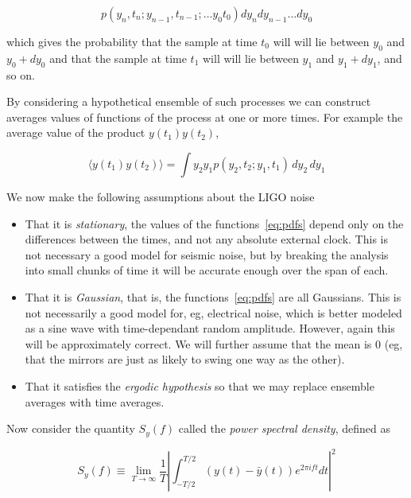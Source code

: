 \begin{equation*}
\label{eq:pdfs}
p(y_n, t_n; y_{n-1}, t_{n-1}; \ldots y_0 t_0) dy_n dy_{n-1} \ldots
dy_0
\end{equation*}

which gives the probability that the sample at time $t_0$ will will
lie between $y_0$ and $y_0 + dy_0$ and that the sample at time $t_1$
will will lie between $y_1$ and $y_1 + dy_1$, and so on.

By considering a hypothetical ensemble of such processes we can 
construct averages values of functions of the process at one or more
times.  For example the average value of the product $y(t_1)y(t_2)$,

\begin{equation*}
\langle y(t_1) y(t_2) \rangle = \int y_2 y_1
p(y_2, t_2; y_1, t_1)\, dy_2\, dy_1
\end{equation*}

We now make the following assumptions about the LIGO noise

\begin{itemize}
\item That it is \emph{stationary}, the values of the
functions~\ref{eq:pdfs} depend only on the differences between the
times, and not any absolute external clock.  This is not necessary a
good model for seismic noise, but by breaking the analysis into small
chunks of time it will be accurate enough over the span of each.

\item That it is \emph{Gaussian}, that is, the functions~\ref{eq:pdfs}
are all Gaussians.  This is not necessarily a good model for, eg,
electrical noise, which is better modeled as a sine wave with
time-dependant random amplitude.  However, again this will be
approximately correct.  We will further assume that the mean is 0
(eg, that the mirrors are just as likely to swing one way as the
other).

\item That it satisfies the \emph{ergodic hypothesis} so that we may
replace ensemble averages with time averages.

\end{itemize}

Now consider the quantity $S_y(f)$ called the \emph{power spectral
density}, defined as

\begin{equation}
\label{eq:psd1}
S_y(f) \equiv \lim_{T \to \infty} 
\frac{1}{T} \left| \int_{-T/2}^{T/2} (y(t) - \bar{y}(t))
e^{2 \pi i f t} dt \right|^2
\end{equation}

